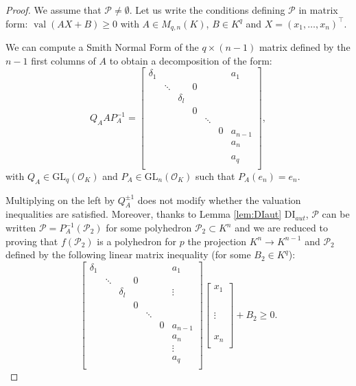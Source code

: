 \documentclass[a4paper,oneside,10pt]{article}
\newcommand{\PP}{\mathcal{P}}
\DeclareMathOperator{\val}{val}
\newcommand{\OK}{\mathcal{O}_K}
\newcommand{\GL}{\mathrm{GL}}
\begin{document}
\begin{proof}
We assume that $\PP \neq \emptyset$.
Let us write the conditions defining $\PP$
in matrix form:
$\val(A X+B) \geq 0$ 
with $A \in M_{q,n}(K)$, $B \in K^q$
and $X=(x_1,\dots,x_n)^\intercal$. 


We can compute a Smith Normal Form
of the $q \times (n-1)$ matrix defined by the 
$n-1$ first columns of $A$
to obtain a decomposition of the form:
\[ Q_A A P_A^{-1} = \begin{bmatrix}
\delta_1	& 		& 			&   &		 &  &a_1	\\
			& \ddots& 			& 0	&		 &	&		\\
			&		& \delta_l  &   & 		 &	&		\\
			&		&			&0  & 		 &	& 		\\
			&		&			&   & \ddots &	&		\\
			&		&			&	&		 & 0&a_{n-1} \\
			&		&			&	&		 &	&a_n 	\\
			&		&			&	&		 &	&    	\\
			&		&			&	&		 &	&a_q 	\\			
\end{bmatrix},\]
with $Q_A \in \GL_q(\OK)$ and $P_A \in \GL_n(\OK)$ such that $P_A(e_n)=e_n.$

Multiplying on the left by $Q_A^{\pm 1}$ does not
modify whether the valuation inequalities are satisfied.
Moreover, thanks to Lemma \ref{lem:DIaut} DI${}_{aut}$,
$\PP$ can be written
$\PP=P_A^{-1}(\PP_2)$ for some polyhedron $\PP_2 \subset K^n$
and we are reduced to proving that
$f(\PP_2)$ is a polyhedron for $p$ the projection
$K^n \rightarrow K^{n-1}$ and $\PP_2$
defined by the following linear matrix inequality (for some $B_2 \in K^q$):
\[  \begin{bmatrix}
\delta_1	& 		& 			&   &		 &  &a_1	\\
			& \ddots& 			& 0	&		 &	&		\\
			&		& \delta_l  &   & 		 &	& \vdots\\
			&		&			&0  & 		 &	& 		\\
			&		&			&   & \ddots &	&		\\
			&		&			&	&		 & 0&a_{n-1} \\
			&		&			&	&		 &	&a_n 	\\
			&		&			&	&		 &	& \vdots   	\\
			&		&			&	&		 &	&a_q 	\\			
\end{bmatrix} \begin{bmatrix} x_1 \\ \\ \\ \\ \\ \vdots \\ \\ \\ \\ x_n \\ \end{bmatrix} + B_2 \geq 0.\]




\end{proof}
\end{document}
